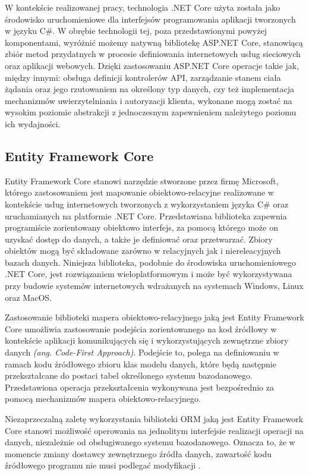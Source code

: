 W kontekście realizowanej pracy, technologia .NET Core użyta została jako środowisko uruchomieniowe dla interfejsów programowania aplikacji tworzonych w języku C\#. W obrębie technologii tej, poza przedstawionymi powyżej komponentami, wyróżnić możemy natywną bibliotekę ASP.NET Core, stanowiącą zbiór metod przydatnych w procesie definiowania internetowych usług sieciowych oraz aplikacji webowych. Dzięki zastosowaniu ASP.NET Core operacje takie jak, między innymi: obsługa definicji kontrolerów API, zarządzanie stanem ciała żądania oraz jego rzutowaniem na określony typ danych, czy też implementacja mechanizmów uwierzytelniania i autoryzacji klienta, wykonane mogą zostać na wysokim poziomie abstrakcji z jednoczesnym zapewnieniem należytego poziomu ich wydajności.
\subsection*{Entity Framework Core}
Entity Framework Core stanowi narzędzie stworzone przez firmę Microsoft, którego zastosowaniem jest mapowanie obiektowo-relacyjne realizowane w kontekście usług internetowych tworzonych z wykorzystaniem języka C\# oraz uruchamianych na platformie .NET Core. Przedstawiana biblioteka zapewnia programiście zorientowany obiektowo interfejs, za pomocą którego może on uzyskać dostęp do danych, a także je definiować oraz przetwarzać. Zbiory obiektów mogą być składowane zarówno w relacyjnych jak i niereleacyjnych bazach danych. Niniejsza biblioteka, podobnie do środowiska uruchomieniowego .NET Core, jest rozwiązaniem wieloplatformowym i może być wykorzystywana przy budowie systemów internetowych wdrażanych na systemach Windows, Linux oraz MacOS.

Zastosowanie biblioteki mapera obiektowo-relacyjnego jaką jest Entity Framework Core umożliwia zastosowanie podejścia zorientowanego na kod źródłowy w kontekście aplikacji komunikujących się i wykorzystujących zewnętrzne zbiory danych \textit{(ang. Code-First Approach)}. Podejście to, polega na definiowaniu w ramach kodu źródłowego zbioru klas modelu danych, które będą następnie przekształcane do postaci tabel określonego systemu bazodanowego. Przedstawiona operacja przekształcenia wykonywana jest bezpośrednio za pomocą mechanizmów mapera obiektowo-relacyjnego. 

Niezaprzeczalną zaletę wykorzystania biblioteki ORM jaką jest Entity Framework Core stanowi możliwość operowania na jednolitym interfejsie realizacji operacji na danych, niezależnie od obsługiwanego systemu bazodanowego. Oznacza to, że w momencie zmiany dostawcy zewnętrznego źródła danych, zawartość kodu źródłowego programu nie musi podlegać modyfikacji \cite{smith2021entity}.
